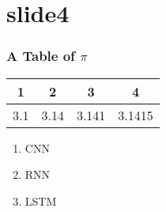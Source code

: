 \documentclass[xcolor=dvipsnames]{beamer}
\begin{document}
\section{slide4}
\begin{frame}[t]
    \frametitle{A Table of $\pi$}
    \centering
    \begin{tabular}{|c|c|c|c|} \hline
        1 & 2 & 3 & 4 \\ \hline
        3.1 & 3.14 & 3.141 & 3.1415 \\ \hline
    \end{tabular}
    \begin{enumerate}
        \centering
        \item CNN
        \item RNN
        \item LSTM
    \end{enumerate}
\end{frame}
\end{document}
